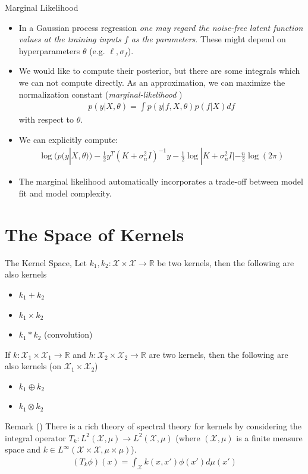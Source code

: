 \documentclass[10pt]{beamer}
\begin{document}
\begin{frame}{Marginal Likelihood}{\cite[Chapter 5.4.1]{RW05}}
\begin{itemize}
\item In a Gaussian process regression {\em one may regard the noise-free latent function values at the training inputs $f$ as the parameters}. These might depend on hyperparameters $\theta$ (e.g. $\ell, \sigma_f$).
\item We would like to compute their posterior, but there are some integrals which we can not compute directly. As an approximation, we can maximize the normalization constant ({\em marginal-likelihood} ) 
\begin{align*}
p(y|X, \theta) = \int p(y|f, X, \theta)p(f|X) df 
\end{align*}
with respect to $\theta$.
\pause
\item We can explicitly compute:
\begin{align*}
\log(p(y|X, \theta))-\frac{1}{2}y^T (K+\sigma_n^2I)^{-1}y - \frac{1}{2}\log|K+\sigma_n^2I| - \frac{n}{2}\log (2\pi)
\end{align*}
\item The marginal likelihood automatically incorporates a trade-off between model fit and model complexity.
\end{itemize}
\end{frame}


\section{The Space of Kernels}

\begin{frame}{The Kernel Space}{\cite{ROERGA}, \cite[Chapter 4]{RW05}}
Let $k_1, k_2: \mathcal{X}\times\mathcal{X}\longrightarrow \mathbb{R}$ be two kernels, then the following are also kernels 
\begin{itemize}
\item $k_1 + k_2$ 
\item $k_1 \times k_2$
\item $k_1*k_2$ (convolution)
\end{itemize}
If $k: \mathcal{X}_1\times\mathcal{X}_1\longrightarrow \mathbb{R}$ and $h: \mathcal{X}_2\times\mathcal{X}_2\longrightarrow \mathbb{R}$ are two kernels, then the following are also kernels (on $\mathcal{X}_1 \times \mathcal{X}_2$)
\begin{itemize}
\item $k_1 \oplus k_2$ 
\item $k_1 \otimes k_2$
\end{itemize}
\begin{block}{Remark (\cite[Chapter 4.3]{RW05})}
There is a rich theory of spectral theory for kernels by considering the integral operator $T_k : L^2(\mathcal{X}, \mu) \longrightarrow L^2(\mathcal{X}, \mu)$ (where $(\mathcal{X}, \mu)$ is a finite measure space and $k\in L^{\infty}(\mathcal{X}\times \mathcal{X} , \mu\times\mu)$). 
\begin{align*}
(T_k\phi)(x) = \int_{\mathcal{X}} k(x, x')\phi(x') d\mu(x')
\end{align*}
\end{block}
\end{frame}
\end{document}
